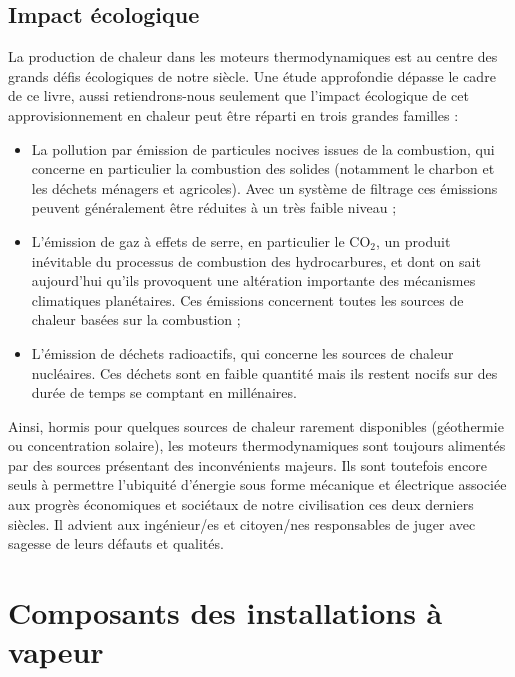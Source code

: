 
	\subsection{Impact écologique}
	
		La production de chaleur dans les moteurs thermodynamiques est au centre des grands défis écologiques de notre siècle. Une étude approfondie dépasse le cadre de ce livre, aussi retiendrons-nous seulement que l’impact écologique de cet approvisionnement en chaleur peut être réparti en trois grandes familles :
		\begin{itemize}
			\item La pollution par émission de particules nocives issues de la combustion, qui concerne en particulier la combustion des solides (notamment le charbon et les déchets ménagers et agricoles). Avec un système de filtrage ces émissions peuvent généralement être réduites à un très faible niveau ;
			\item L’émission de gaz à effets de serre, en particulier le $\text{CO}_2$, un produit inévitable du processus de combustion des hydrocarbures, et dont on sait aujourd’hui qu’ils provoquent une altération importante des mécanismes climatiques planétaires. Ces émissions concernent toutes les sources de chaleur basées sur la combustion ;
			\item L’émission de déchets radioactifs, qui concerne les sources de chaleur nucléaires. Ces déchets sont en faible quantité mais ils restent nocifs sur des durée de temps se comptant en millénaires.
		\end{itemize}

		Ainsi, hormis pour quelques sources de chaleur rarement disponibles (géothermie ou concentration solaire), les moteurs thermodynamiques sont toujours alimentés par des sources présentant des inconvénients majeurs. Ils sont toutefois encore seuls à permettre l’ubiquité d’énergie sous forme mécanique et électrique associée aux progrès économiques et sociétaux de notre civilisation ces deux derniers siècles. Il advient aux ingénieur/es et citoyen/nes responsables de juger avec sagesse de leurs défauts et qualités.


\section{Composants des installations à vapeur}

